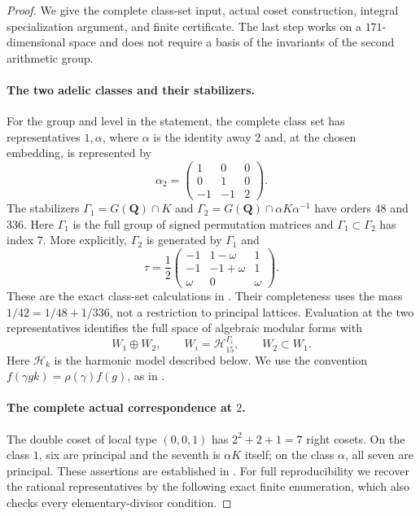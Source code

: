 \begin{proof}
We give the complete class-set input, actual coset construction,
integral specialization argument, and finite certificate. The last
step works on a $171$-dimensional space and does not require a basis
of the invariants of the second arithmetic group.

\paragraph{The two adelic classes and their stabilizers.}
For the group and level in the statement, the complete class set has
representatives $1,\alpha$, where $\alpha$ is the identity away $2$
and, at the chosen embedding, is represented by
\[
 \alpha_2=\begin{pmatrix}1&0&0\\0&1&0\\-1&-1&2\end{pmatrix}.
 \tag{U7.3}
\]
The stabilizers
$\Gamma_1=G(\mathbf Q)\cap K$ and
$\Gamma_2=G(\mathbf Q)\cap\alpha K\alpha^{-1}$ have orders
$48$ and $336$. Here $\Gamma_1$ is the full group of signed
permutation matrices and $\Gamma_1\subset\Gamma_2$ has index $7$.
More explicitly, $\Gamma_2$ is generated by $\Gamma_1$ and
\[
 \tau=\frac12
 \begin{pmatrix}-1&1-\omega&1\\-1&-1+\omega&1\\
                 \omega&0&\omega\end{pmatrix}.
 \tag{U7.4}
\]
These are the exact class-set calculations in
\cite[\S3, printed pp.~6--7]{K17Loeffler2008}. Their completeness
uses the mass $1/42=1/48+1/336$, not a restriction to principal
lattices. Evaluation at the two representatives identifies the full
space of algebraic modular forms with
\[
 W_1\oplus W_2,
 \qquad W_i=\mathcal H_{15}^{\Gamma_i},
 \qquad W_2\subset W_1.
 \tag{U7.5}
\]
Here $\mathcal H_k$ is the harmonic model described below. We use
the convention $f(\gamma gk)=\rho(\gamma)f(g)$, as in
\cite[\S\S2.1--2.2, printed pp.~3--4]{K17Loeffler2008}.

\paragraph{The complete actual correspondence at $2$.}
The double coset of local type $(0,0,1)$ has $2^2+2+1=7$ right
cosets. On the class $1$, six are principal and the seventh is
$\alpha K$ itself; on the class $\alpha$, all seven are principal.
These assertions are established in
\cite[Lemma~2.5 and \S3, printed pp.~5--7]{K17Loeffler2008}.
For full reproducibility we recover the rational representatives by
the following exact finite enumeration, which also checks every
elementary-divisor condition.


\end{proof}
